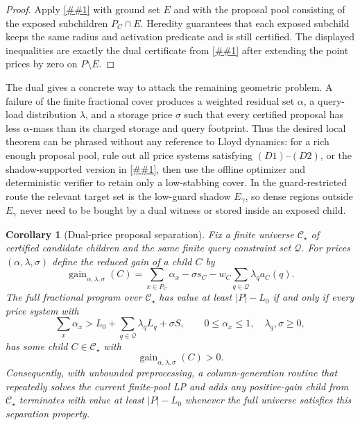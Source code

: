 \documentclass[10pt]{article}
\newcommand{\cref}[1]{\ref{##1}}
\newtheorem{corollary}[theorem]{Corollary}
\theoremstyle{definition}
\begin{document}
\begin{proof}
   Apply \cref{lem:finite-pool-dual} with ground set $E$ and with the proposal
   pool consisting of the exposed subchildren $P_C\cap E$.  Heredity guarantees
   that each exposed subchild keeps the same radius and activation predicate
   and is still certified.  The displayed inequalities are exactly the dual
   certificate from \cref{lem:finite-pool-dual} after extending the point prices
   by zero on $P\setminus E$.
\end{proof}

The dual gives a concrete way to attack the remaining geometric problem.  A
failure of the finite fractional cover produces a weighted residual set
$\alpha$, a query-load distribution $\lambda$, and a storage price $\sigma$ such
that every certified proposal has less $\alpha$-mass than its charged storage
and query footprint.  Thus the desired local theorem can be phrased without any
reference to Lloyd dynamics: for a rich enough proposal pool, rule out all
price systems satisfying \((D1)\)--\((D2)\), or the shadow-supported version in
\cref{cor:shadow-finite-pool-dual}, then use the offline optimizer and
deterministic verifier to retain only a low-stabbing cover.  In the
guard-restricted route the relevant target set is the low-guard shadow
$E_\gamma$, so dense regions outside $E_\gamma$ never need to be bought by a
dual witness or stored inside an exposed child.

\begin{corollary}[Dual-price proposal separation]\label{cor:dual-price-separation}
   Fix a finite universe $\mathcal C_\star$ of certified candidate children and
   the same finite query constraint set $\mathcal Q$.  For prices
   $(\alpha,\lambda,\sigma)$ define the reduced gain of a child $C$ by
   \[
      \operatorname{gain}_{\alpha,\lambda,\sigma}(C)
      =
      \sum_{x\in P_C}\alpha_x
      -
      \sigma s_C
      -
      w_C\sum_{q\in\mathcal Q}\lambda_q a_C(q).
   \]
   The full fractional program over $\mathcal C_\star$ has value at least
   $|P|-L_0$ if and only if every price system with
   \[
      \sum_x\alpha_x
      >
      L_0+\sum_{q\in\mathcal Q}\lambda_qL_q+\sigma S,
      \qquad
      0\le\alpha_x\le1,\quad \lambda_q,\sigma\ge0,
   \]
   has some child $C\in\mathcal C_\star$ with
   \[
      \operatorname{gain}_{\alpha,\lambda,\sigma}(C)>0.
   \]
   Consequently, with unbounded preprocessing, a column-generation routine that
   repeatedly solves the current finite-pool LP and adds any positive-gain child
   from $\mathcal C_\star$ terminates with value at least $|P|-L_0$ whenever the
   full universe satisfies this separation property.
\end{corollary}
\end{document}
